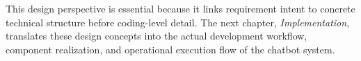 This design perspective is essential because it links requirement intent to concrete technical structure before coding-level detail. The next chapter, \textit{Implementation}, translates these design concepts into the actual development workflow, component realization, and operational execution flow of the chatbot system.
